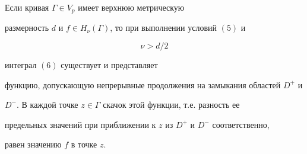\begin{thm}


Если кривая $\Gamma\in V_p$ имеет верхнюю метрическую


размерность $d$ и $f\in H_{\nu}(\Gamma)$, то при выполнении условий $(5)$ и


\begin{equation}


\nu > d/2


\end{equation}


интеграл $(6)$ существует и представляет


функцию, допускающую непрерывные продолжения на замыкания областей $D^+$ и


$D^-$. В каждой точке $z\in\Gamma$ скачок этой функции, т.е. разность ее


предельных значений при приближении к $z$ из $D^+$ и $D^-$ соответственно,


равен значению $f$ в точке $z$.


\end{thm}






